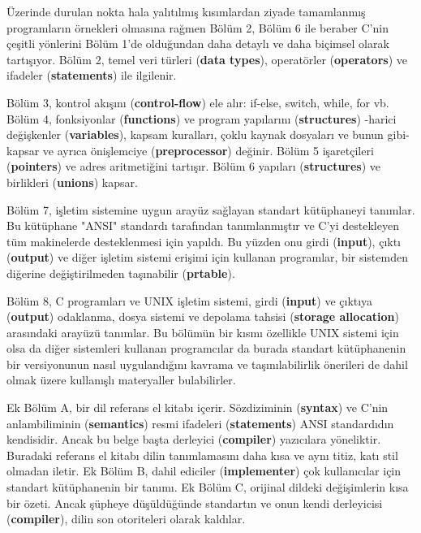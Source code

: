 \documentclass[a4paper,12pt,oneside]{book}
\begin{document}
\par Üzerinde durulan nokta hala yalıtılmış kısımlardan ziyade tamamlanmış programların örnekleri olmasına rağmen Bölüm 2, Bölüm 6 ile beraber C'nin çeşitli yönlerini Bölüm 1'de olduğundan daha detaylı ve daha biçimsel olarak tartışıyor. Bölüm 2, temel veri türleri (\textbf{data types}), operatörler (\textbf{operators}) ve ifadeler (\textbf{statements}) ile ilgilenir. \pagebreak

\noindent \thispagestyle{introduction} Bölüm 3, kontrol akışını (\textbf{control-flow}) ele alır: if-else, switch, while, for vb. Bölüm 4, fonksiyonlar (\textbf{functions}) ve program yapılarını (\textbf{structures}) -harici değişkenler (\textbf{variables}), kapsam kuralları, çoklu kaynak dosyaları ve bunun gibi- kapsar ve ayrıca önişlemciye (\textbf{preprocessor}) değinir. Bölüm 5 işaretçileri (\textbf{pointers}) ve adres aritmetiğini tartışır. Bölüm 6 yapıları (\textbf{structures}) ve birlikleri (\textbf{unions}) kapsar.
\par Bölüm 7, işletim sistemine uygun arayüz sağlayan standart kütüphaneyi tanımlar. Bu kütüphane "ANSI" standardı tarafından tanımlanmıştır ve C'yi destekleyen tüm makinelerde desteklenmesi için yapıldı. Bu yüzden onu girdi (\textbf{input}), çıktı (\textbf{output}) ve diğer işletim sistemi erişimi için kullanan programlar, bir sistemden diğerine değiştirilmeden taşınabilir (\textbf{prtable}).
\par Bölüm 8, C programları ve UNIX işletim sistemi, girdi (\textbf{input}) ve çıktıya (\textbf{output}) odaklanma, dosya sistemi ve depolama tahsisi (\textbf{storage allocation}) arasındaki arayüzü tanımlar. Bu bölümün bir kısmı özellikle UNIX sistemi için olsa da diğer sistemleri kullanan programcılar da burada standart kütüphanenin bir versiyonunun nasıl uygulandığını kavrama ve taşınılabilirlik önerileri de dahil olmak üzere kullanışlı materyaller bulabilirler.
\par Ek Bölüm A, bir dil referans el kitabı içerir. Sözdiziminin (\textbf{syntax}) ve C'nin anlambiliminin (\textbf{semantics}) resmi ifadeleri (\textbf{statements}) ANSI standardıdın kendisidir. Ancak bu belge başta derleyici (\textbf{compiler}) yazıcılara yöneliktir. Buradaki referans el kitabı dilin tanımlamasını daha kısa ve aynı titiz, katı stil olmadan iletir. Ek Bölüm B, dahil ediciler (\textbf{implementer}) çok kullanıcılar için standart kütüphanenin bir tanımı. Ek Bölüm C, orijinal dildeki değişimlerin kısa bir özeti. Ancak şüpheye düşüldüğünde standartın ve onun kendi derleyicisi (\textbf{compiler}), dilin son otoriteleri olarak kaldılar.
\end{document}
